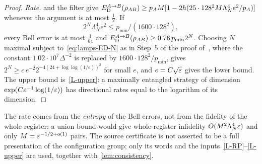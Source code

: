 \begin{proof}
\emph{Rate.}  and the filter give
$E_{\mathrm D}^{A\to B}(\rho_{AB})\ge p_AM[1-2h(25\cdot128^2M\Lambda_N^4e^2/p_A)]$ whenever the argument is at most $\frac12$. If
\begin{equation}\label{eq:lamps-ED-N}
2^N\Lambda_N^4e^2\le p_{\min}/(1600\cdot128^2),
\end{equation}
every Bell error is at most $\frac1{64}$ and $E_{\mathrm D}^{A\to B}(\rho_{AB})\ge0.76\,p_{\min}2^N$. Choosing $N$ maximal subject
to~\eqref{eq:lamps-ED-N} as in Step~5 of the proof of~\cite[Theorem~8.1]{DM-game}, where the constant $1.02\cdot10^7\Delta^{-2}$ is
replaced by $1600\cdot128^2/p_{\min}$, gives $2^N\ge c\,e^{-2}2^{-4(24+\log\log(1/e))^2}$ for small $e$, and $e=C\sqrt{\varepsilon}$ gives the lower
bound. The upper bound is~\ref{L-upper}: a maximally entangled strategy of dimension $\exp(C\varepsilon^{-1}\log(1/\varepsilon))$ has directional
rates equal to the logarithm of its dimension.
\end{proof}

The rate comes from the \emph{entropy} of the Bell errors, not from the fidelity of the whole register: a union bound would give
whole-register infidelity $O(M^2\Lambda_N^4\varepsilon)$ and only $M=\varepsilon^{-1/2+o(1)}$ pairs. The source certificate is not asserted to be
a full presentation of the configuration group; only its words and the inputs~\ref{L-RP}--\ref{L-upper} are used, together
with \cref{lem:consistency}.
